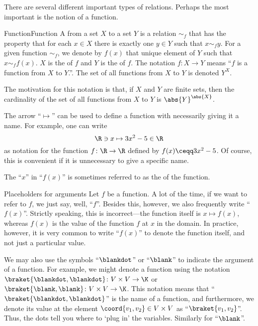 There are several different important types of relations.  Perhaps the most important is the notion of a function.
\begin{dfn}{Function}{Function}
A  from a set $X$ to a set $Y$ is a relation $\sim _f$ that has the property that for each $x\in X$ there is exactly one $y\in Y$ such that $x\sim _fy$.  For a given function $\sim _f$, we denote by $f(x)$ that unique element of $Y$ such that $x\sim _ff(x)$.  $X$ is the  of $f$ and $Y$ is the  of $f$.  The notation $f\colon X\rightarrow Y$ means ``$f$ is a function from $X$ to $Y$.''.  The set of all functions from $X$ to $Y$ is denoted $Y^X$.
\begin{rmk}
The motivation for this notation is that, if $X$ and $Y$ are finite sets, then the cardinality of the set of all functions from $X$ to $Y$ is $\abs{Y}^{\abs{X}}$.
\end{rmk}
\begin{rmk}
The arrow ``$\mapsto$''\index[notation]{$\mapsto$} can be used to define a function with necessarily giving it a name.  For example, one can write
\begin{equation}
\R \ni x\mapsto 3x^2-5\in \R
\end{equation}
as notation for the function $f\colon \R \rightarrow \R$ defined by $f(x)\ceqq 3x^2-5$.  Of course, this is convenient if it is unnecessary to give a specific name.
\end{rmk}
\begin{rmk}
The ``$x$'' in ``$f(x)$'' is sometimes referred to as the  of the function.
\end{rmk}
\end{dfn}
\begin{ntn}{Placeholders for arguments}{}
Let $f$ be a function.  A lot of the time, if we want to refer to $f$, we just say, well, ``$f$''.  Besides this, however, we also frequently write ``$f(x)$''.  Strictly speaking, this is incorrect---the function itself is $x\mapsto f(x)$, whereas $f(x)$ is the value of the function $f$ at $x$ in the domain.  In practice, however, it is very common to write ``$f(x)$'' to denote the function itself, and not just a particular value.

We may also use the symbols ``$\blankdot$'' or ``$\blank$'' to indicate the argument of a function.  For example, we might denote a function using the notation $\braket{\blankdot ,\blankdot}\colon V\times V\rightarrow \K$ or $\braket{\blank ,\blank}\colon V\times V\rightarrow \K$.  This notation means that ``$\braket{\blankdot ,\blankdot}$'' is the name of a function, and furthermore, we denote its value at the element $\coord{v_1,v_2}\in V\times V$ as ``$\braket{v_1,v_2}$''.  Thus, the dots tell you where to `plug in' the variables.  Similarly for ``$\blank$''.
\end{ntn}
